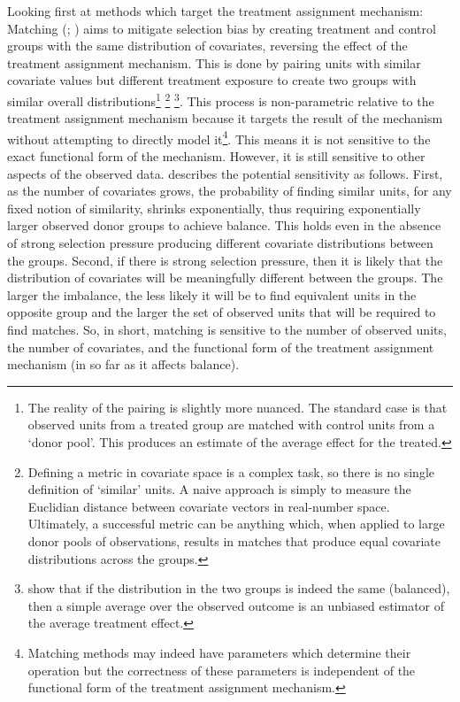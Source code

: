 \documentclass[../main.tex]{subfiles}
\begin{document}
\vspace{\baselineskip}
Looking first at methods which target the treatment assignment mechanism: Matching (\cite{Rosenbaum1983TheEffects}; \cite{Abadie2006LargeEffects}) aims to mitigate selection bias by creating treatment and control groups with the same distribution of covariates, reversing the effect of the treatment assignment mechanism. This is done by pairing units with similar covariate values but different treatment exposure to create two groups with similar overall distributions\footnote{ The reality of the pairing is slightly more nuanced. The standard case is that observed units from a treated group are matched with control units from a ‘donor pool’. This produces an estimate of the average effect for the treated. } \footnote{ Defining a metric in covariate space is a complex task, so there is no single definition of ‘similar’ units. A naive approach is simply to measure the Euclidian distance between covariate vectors in real-number space. Ultimately, a successful metric can be anything which, when applied to large donor pools of observations, results in matches that produce equal covariate distributions across the groups. } \footnote{\cite{Imai2008MisunderstandingsInference} show that if the distribution in the two groups is indeed the same (balanced), then a simple average over the observed outcome is an unbiased estimator of the average treatment effect. }. This process is non-parametric relative to the treatment assignment mechanism because it targets the result of the mechanism without attempting to directly model it\footnote{ Matching methods may indeed have parameters which determine their operation but the correctness of these parameters is independent of the functional form of the treatment assignment mechanism.  }. This means it is not sensitive to the exact functional form of the mechanism. However, it is still sensitive to other aspects of the observed data. \cite{Broomberg2017DeepInference} describes the potential sensitivity as follows. First, as the number of covariates grows, the probability of finding similar units, for any fixed notion of similarity, shrinks exponentially, thus requiring exponentially larger observed donor groups to achieve balance. This holds even in the absence of strong selection pressure producing different covariate distributions between the groups. Second, if there is strong selection pressure, then it is likely that the distribution of covariates will be meaningfully different between the groups. The larger the imbalance, the less likely it will be to find equivalent units in the opposite group and the larger the set of observed units that will be required to find matches. So, in short, matching is sensitive to the number of observed units, the number of covariates, and the functional form of the treatment assignment mechanism (in so far as it affects balance).\par
\end{document}
